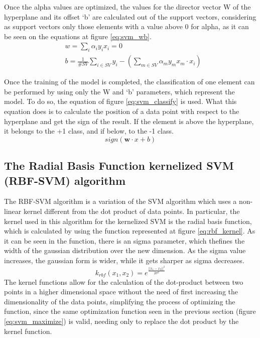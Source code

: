 \documentclass[10pt, journal]{IEEEtran}
\begin{document}
Once the alpha values are optimized, the values for the director vector W of the hyperplane and its offset `b' are calculated out of the support vectors, considering as support vectors only those elements with a value above 0 for alpha, as it can be seen on the equations at figure \ref{eq:svm_wb}.\\
\begin{equation}
	\begin{aligned}
		&w = \sum_i{\alpha_iy_ix_i} = 0\\
		&b = \frac{1}{\#SV}\sum_{i \in SV}{y_i-(\sum_{m \in SV}{\alpha_my_mx_m\cdot x_i})}
	\end{aligned}
	\label{eq:svm_wb}
\end{equation}

Once the training of the model is completed, the classification of one element can be performed by using only the W and `b' parameters, which represent the model. To do so, the equation of figure \ref{eq:svm_classify} is used. What this equation does is to calculate the position of a data point with respect to the hyperplane and get the sign of the result. If the element is above the hyperplane, it belongs to the +1 class, and if below, to the -1 class.
\begin{equation}
	sign(\mathbf{w}\cdot x + b)
	\label{eq:svm_classify}
\end{equation}

\subsection{The Radial Basis Function kernelized SVM (RBF-SVM) algorithm} %
\label{sub:the_radial_basis_function_kernelized_svm_rbf_svm_algorithm}

The RBF-SVM algorithm is a variation of the SVM algorithm which uses a non-linear kernel different from the dot product of data points. In particular, the kernel used in this algorithm for the kernelized SVM is the radial basis function, which is calculated by using the function represented at figure \ref{eq:rbf_kernel}. As it can be seen in the function, there is an sigma parameter, which thefines the width of the gaussian distribution over the new dimension. As the sigma value increases, the gaussian form is wider, while it gets sharper as sigma decreases.\\
\begin{equation}
	k_{rbf}(x_1,x_2) = e^\frac{||x_1-x_2||^2}{2\sigma^2}
	\label{eq:rbf_kernel}
\end{equation}
The kernel functions allow for the calculation of the dot-product between two points in a higher dimensional space without the need of first increasing the dimensionality of the data points, simplifying the process of optimizing the function, since the same optimization function seen in the previous section (figure \ref{eq:svm_maximize}) is valid, needing only to replace the dot product by the kernel function.\\
\end{document}
